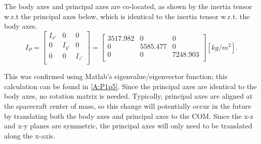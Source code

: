 \documentclass[12pt,a4paper,notitlepage]{article}
\begin{document}
The body axes and principal axes are co-located, as shown by the inertia tensor w.r.t the principal axes below, which is identical to the inertia tensor w.r.t. the body axes.
\begin{equation}
I_{P} =
\begin{bmatrix} 
I_{x'} & 0 & 0 \\
0 & I_{y'} & 0 \\ 
0 & 0 & I_{z'} \\
\end{bmatrix}
 =
\begin{bmatrix}
3517.982 & 0 & 0 \\
0 & 5585.477 & 0 \\ 
0 & 0 & 7248.903 \\
\end{bmatrix}
[kg/m^2].
\end{equation}

This was confirmed using Matlab's eigenvalue/eigenvector function; this calculation can be found in \ref{A:P1p5}. Since the principal axes are identical to the body axes, no rotation matrix is needed. Typically, principal axes are aligned at the spacecraft center of mass, so this change will potentially occur in the future by translating both the body axes and principal axes to the COM. Since the x-z and x-y planes are symmetric, the principal axes will only need to be translated along the x-axis.







\end{document}
